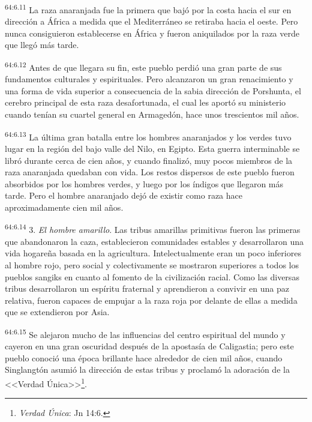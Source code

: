 \par
\textsuperscript{64:6.11} La raza anaranjada fue la primera que bajó por la costa hacia el sur en dirección a África a medida que el Mediterráneo se retiraba hacia el oeste. Pero nunca consiguieron establecerse en África y fueron aniquilados por la raza verde que llegó más tarde.

\par
\textsuperscript{64:6.12} Antes de que llegara su fin, este pueblo perdió una gran parte de sus fundamentos culturales y espirituales. Pero alcanzaron un gran renacimiento y una forma de vida superior a consecuencia de la sabia dirección de Porshunta, el cerebro principal de esta raza desafortunada, el cual les aportó su ministerio cuando tenían su cuartel general en Armagedón, hace unos trescientos mil años.

\par
\textsuperscript{64:6.13} La última gran batalla entre los hombres anaranjados y los verdes tuvo lugar en la región del bajo valle del Nilo, en Egipto. Esta guerra interminable se libró durante cerca de cien años, y cuando finalizó, muy pocos miembros de la raza anaranjada quedaban con vida. Los restos dispersos de este pueblo fueron absorbidos por los hombres verdes, y luego por los índigos que llegaron más tarde. Pero el hombre anaranjado dejó de existir como raza hace aproximadamente cien mil años.

\par
\textsuperscript{64:6.14} 3. \textit{El hombre amarillo}. Las tribus amarillas primitivas fueron las primeras que abandonaron la caza, establecieron comunidades estables y desarrollaron una vida hogareña basada en la agricultura. Intelectualmente eran un poco inferiores al hombre rojo, pero social y colectivamente se mostraron superiores a todos los pueblos sangiks en cuanto al fomento de la civilización racial. Como las diversas tribus desarrollaron un espíritu fraternal y aprendieron a convivir en una paz relativa, fueron capaces de empujar a la raza roja por delante de ellas a medida que se extendieron por Asia.

\par
\textsuperscript{64:6.15} Se alejaron mucho de las influencias del centro espiritual del mundo y cayeron en una gran oscuridad después de la apostasía de Caligastia; pero este pueblo conoció una época brillante hace alrededor de cien mil años, cuando Singlangtón asumió la dirección de estas tribus y proclamó la adoración de la <<Verdad Única>>\footnote{\textit{Verdad Única}: Jn 14:6.}.

